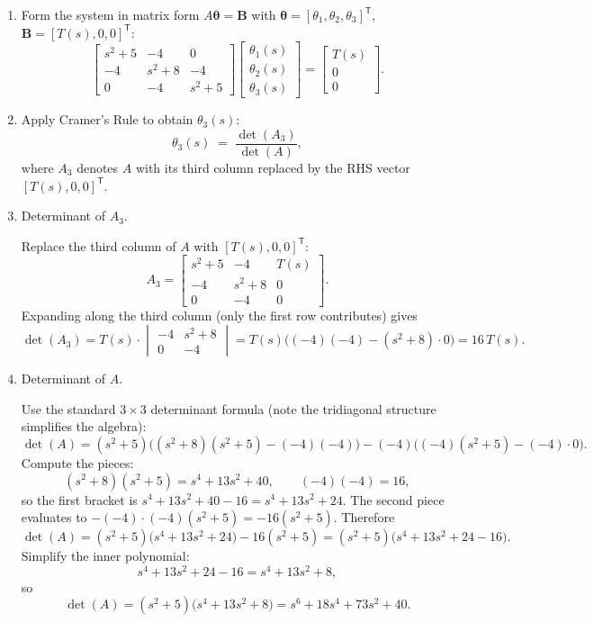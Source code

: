 \documentclass[11pt]{article}
\begin{document}
\begin{enumerate}[label=(\alph*), itemindent=*, leftmargin=*, nolistsep]
    \item Form the system in matrix form \(A\boldsymbol{\theta} = \boldsymbol{B}\) with \(\boldsymbol{\theta}=[\theta_1,\theta_2,\theta_3]^\mathsf{T}\), \(\boldsymbol{B}=[T(s),0,0]^\mathsf{T}\):
    \[
    \begin{bmatrix}
    s^2 + 5 & -4 & 0 \\[6pt]
    -4 & s^2 + 8 & -4 \\[6pt]
    0 & -4 & s^2 + 5
    \end{bmatrix}
    \begin{bmatrix}
    \theta_1(s) \\[4pt] \theta_2(s) \\[4pt] \theta_3(s)
    \end{bmatrix}
    =
    \begin{bmatrix}
    T(s) \\[4pt] 0 \\[4pt] 0
    \end{bmatrix}.
    \]

    \item Apply Cramer's Rule to obtain \(\theta_3(s)\):
    \[
    \theta_3(s) \;=\; \frac{\det(A_3)}{\det(A)},
    \]
    where \(A_3\) denotes \(A\) with its third column replaced by the RHS vector \([T(s),0,0]^\mathsf{T}\).

    \item Determinant of \(A_3\).

    Replace the third column of \(A\) with \([T(s),0,0]^\mathsf{T}\):
    \[
    A_3 =
    \begin{bmatrix}
    s^2 + 5 & -4 & T(s) \\[6pt]
    -4 & s^2 + 8 & 0 \\[6pt]
    0 & -4 & 0
    \end{bmatrix}.
    \]
    Expanding along the third column (only the first row contributes) gives
    \[
    \det(A_3) = T(s)\cdot
    \begin{vmatrix}
    -4 & s^2+8 \\[4pt]
    0 & -4
    \end{vmatrix}
    = T(s)\big((-4)(-4) - (s^2+8)\cdot 0\big) = 16\,T(s).
    \]

    \item Determinant of \(A\).

    Use the standard \(3\times3\) determinant formula (note the tridiagonal structure simplifies the algebra):
    \[
    \det(A)
    = (s^2+5)\big((s^2+8)(s^2+5) - (-4)(-4)\big)
    - (-4)\big((-4)(s^2+5) - (-4)\cdot 0\big).
    \]
    Compute the pieces:
    \[
    (s^2+8)(s^2+5) = s^4 + 13s^2 + 40,\qquad (-4)(-4)=16,
    \]
    so the first bracket is \(s^4 + 13s^2 + 40 - 16 = s^4 + 13s^2 + 24\).
    The second piece evaluates to \(-(-4)\cdot(-4)(s^2+5) = -16(s^2+5)\).
    Therefore
    \[
    \det(A) = (s^2+5)\big(s^4 + 13s^2 + 24\big) - 16(s^2+5)
    = (s^2+5)\big(s^4 + 13s^2 + 24 - 16\big).
    \]
    Simplify the inner polynomial:
    \[
    s^4 + 13s^2 + 24 - 16 = s^4 + 13s^2 + 8,
    \]
    so
    \[
    \det(A) = (s^2+5)\big(s^4 + 13s^2 + 8\big)
    = s^6 + 18s^4 + 73s^2 + 40.
    \]


\end{enumerate}
\end{document}
